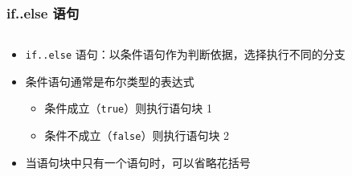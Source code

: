 \begin{frame}[fragile]
    \frametitle{if..else 语句}

    \begin{columns}
        \begin{overlayarea}{\textwidth}{.55\textheight}
            \begin{itemize}
                \item \lstinline|if..else| 语句：以条件语句作为判断依据，选择执行不同的分支

                \item 条件语句通常是布尔类型的表达式

                    \begin{itemize}
                        \item<2-> 条件成立（\lstinline|true|）则执行语句块 1
                        \item<3-> 条件不成立（\lstinline|false|）则执行语句块 2
                    \end{itemize}

                \item<4-> 当语句块中只有一个语句时，可以省略花括号
            \end{itemize}
        \end{overlayarea}

        \begin{overlayarea}{\textwidth}{.3\textheight}
            
        \end{overlayarea}
    \end{columns}
\end{frame}

